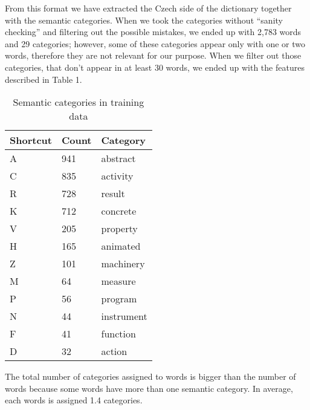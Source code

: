 \documentclass[letterpaper]{article}
\newcommand{\todofn}[1] {
 \footnote{\textbf{TODO : #1}}}
\begin{document}
From this format we have extracted the Czech side of the dictionary together with the semantic categories. 
When we took the categories without ``sanity checking'' and filtering out the possible mistakes, 
we ended up with 2,783 words and 29 categories; however, some of these categories appear only with one or two words, 
therefore they are not relevant for our purpose. When we filter out those categories, that don't appear in at least 30 words, we ended up with the features described in Table 1.

\begin{table}
\begin{tabular}{|l|l|l|}
 \hline
\textbf{Shortcut} &  \textbf{Count} & \textbf{Category}\\
\hline
A & 941 & abstract \\ \hline
C & 835 & activity \\ \hline
R & 728 & result \\ \hline
K & 712 & concrete \\ \hline
V & 205 & property \\ \hline
H & 165 & animated \\ \hline
Z & 101 & machinery \\ \hline
M & 64 & measure\\ \hline
P & 56 & program \\ \hline
N & 44 & instrument \\ \hline
F & 41 & function \\ \hline
D & 32 & action \\ \hline

\end{tabular}
\caption{Semantic categories in training data}
\end{table}


The total number of categories assigned to words is bigger than the number of words because some words have more than one semantic category. In average, each words is assigned 1.4 categories.


\end{document}
